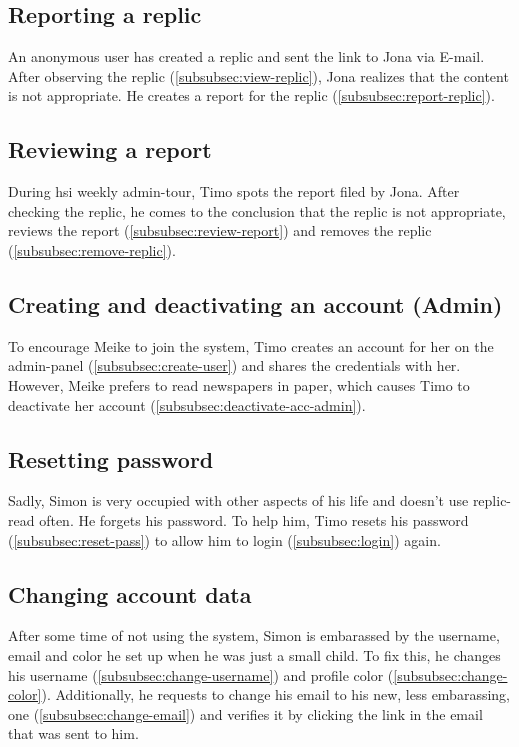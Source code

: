 \subsection{Reporting a replic}\label{subsec:us-reporting-a-replic}
An anonymous user has created a replic and sent the link to Jona via E-mail.
After observing the replic (\ref{subsubsec:view-replic}), Jona realizes that the content is not appropriate.
He creates a report for the replic (\ref{subsubsec:report-replic}).

\subsection{Reviewing a report}\label{subsec:us-reviewing-a-report}
During hsi weekly admin-tour, Timo spots the report filed by Jona.
After checking the replic, he comes to the conclusion that the replic is not appropriate, reviews the report (\ref{subsubsec:review-report}) and removes the replic (\ref{subsubsec:remove-replic}).

\subsection{Creating and deactivating an account (Admin)}\label{subsec:us-creating-an-account-admin}
To encourage Meike to join the system, Timo creates an account for her on the admin-panel (\ref{subsubsec:create-user}) and shares the credentials with her.
However, Meike prefers to read newspapers in paper, which causes Timo to deactivate her account (\ref{subsubsec:deactivate-acc-admin}).

\subsection{Resetting password}\label{subsec:resetting-password}
Sadly, Simon is very occupied with other aspects of his life and doesn't use replic-read often.
He forgets his password.
To help him, Timo resets his password (\ref{subsubsec:reset-pass}) to allow him to login (\ref{subsubsec:login}) again.

\subsection{Changing account data}\label{subsec:changing-account-data}
After some time of not using the system, Simon is embarassed by the username, email and color he set up when he was just a small child.
To fix this, he changes his username (\ref{subsubsec:change-username}) and profile color (\ref{subsubsec:change-color}).
Additionally, he requests to change his email to his new, less embarassing, one (\ref{subsubsec:change-email}) and verifies it by clicking the link in the email that was sent to him.